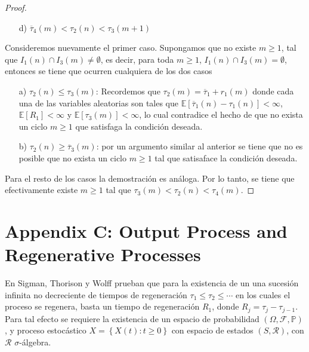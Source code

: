 \documentclass{article}
\newcommand{\esp}{\mathbb{E}}
\newcommand{\prob}{\mathbb{P}}
\begin{document}
\begin{proof}
\begin{itemize}
\item[d)] $\overline{\tau}_{4}\left(m\right)<\tau_{2}\left(n\right)
<\tau_{3}\left(m+1\right)$
\end{itemize}

Consideremos nuevamente el primer caso. Supongamos que no existe $m\geq1$, tal que $I_{1}\left(n\right)\cap I_{3}\left(m\right)\neq\emptyset$, es decir, para toda $m\geq1$, $I_{1}\left(n\right)\cap I_{3}\left(m\right)=\emptyset$, entonces se tiene que ocurren cualquiera de los dos casos

\begin{itemize}
\item[a)] $\tau_{2}\left(n\right)\leq\tau_{3}\left(m\right)$: Recordemos que $\tau_{2}\left(m\right)=\overline{\tau}_{1}+r_{1}\left(m\right)$ donde cada una de las variables aleatorias son tales que $\esp\left[\overline{\tau}_{1}\left(n\right)-\tau_{1}\left(n\right)\right]<\infty$, $\esp\left[R_{1}\right]<\infty$ y $\esp\left[\tau_{3}\left(m\right)\right]<\infty$, lo cual contradice el hecho de que no exista un ciclo $m\geq1$ que satisfaga la condici\'on deseada.

\item[b)] $\tau_{2}\left(n\right)\geq\overline{\tau}_{3}\left(m\right)$: por un argumento similar al anterior se tiene que no es posible que no exista un ciclo $m\geq1$ tal que satisaface la condici\'on deseada.

\end{itemize}

Para el resto de los casos la demostraci\'on es an\'aloga. Por lo tanto, se tiene que efectivamente existe $m\geq1$ tal que $\tau_{3}\left(m\right)<\tau_{2}\left(n\right)<\tau_{4}\left(m\right)$.
\end{proof}
\newpage

%
\section{Appendix C: Output Process and Regenerative Processes}
%
En Sigman, Thorison y Wolff \cite{Sigman2} prueban que para la existencia de un una sucesi\'on infinita no decreciente de tiempos de regeneraci\'on $\tau_{1}\leq\tau_{2}\leq\cdots$ en los cuales el proceso se regenera, basta un tiempo de regeneraci\'on $R_{1}$, donde $R_{j}=\tau_{j}-\tau_{j-1}$. Para tal efecto se requiere la existencia de un espacio de probabilidad $\left(\Omega,\mathcal{F},\prob\right)$, y proceso estoc\'astico $\textit{X}=\left\{X\left(t\right):t\geq0\right\}$ con espacio de estados $\left(S,\mathcal{R}\right)$, con $\mathcal{R}$ $\sigma$-\'algebra.
\end{document}
